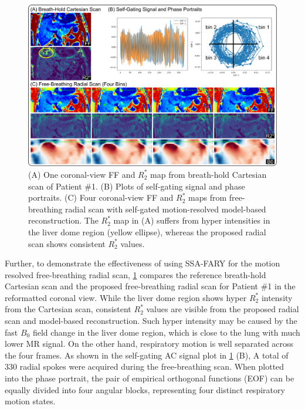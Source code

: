 \documentclass[journal,twoside,web]{ieeecolor}
\begin{document}
\begin{figure}
	\centering 
	\includegraphics[width=\textwidth]{../../figures/tan7.pdf}
	\caption{(A) One coronal-view FF and $R_2^*$ map 
		from breath-hold Cartesian scan of Patient \#1. 
		(B) Plots of self-gating signal and phase portraits. 
		(C) Four coronal-view FF and $R_2^*$ maps from 
		free-breathing radial scan with self-gated motion-resolved 
		model-based reconstruction. 
		The $R_2^*$ map in (A) suffers from 
		hyper intensities in the liver dome region (yellow ellipse), 
		whereas the proposed radial scan shows consistent $R_2^*$ values.}
	\label{FIG:SSA}
\end{figure}

Further, to demonstrate the effectiveness of using SSA-FARY for 
the motion resolved free-breathing radial scan, 
\cref{FIG:SSA} compares the reference breath-hold Cartesian scan 
and the proposed free-breathing radial scan 
for Patient \#1 in the reformatted coronal view. 
While the liver dome region shows hyper $R_2^*$ intensity from the Cartesian scan, 
consistent $R_2^*$ values are visible 
from the proposed radial scan and model-based reconstruction. 
Such hyper intensity may be caused by the fast $B_0$ field change 
in the liver dome region, which is close to the lung with much lower MR signal. 
On the other hand, respiratory motion is well separated across the four frames. 
As shown in the self-gating AC signal plot in \cref{FIG:SSA} (B), 
A total of 330 radial spokes were acquired during the free-breathing scan. 
When plotted into the phase portrait, 
the pair of empirical orthogonal functions (EOF) can be equally divided into 
four angular blocks, representing four distinct respiratory motion states. 
\end{document}

